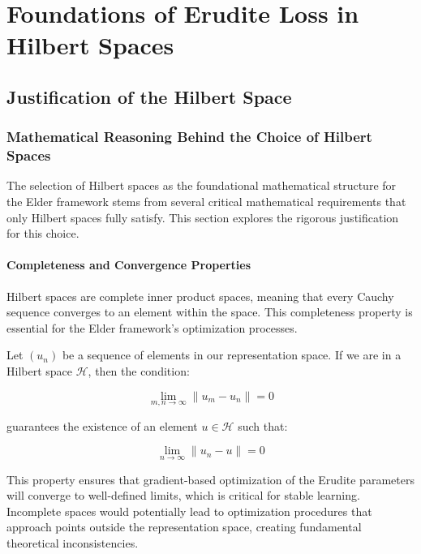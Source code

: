 \chapter{Foundations of Erudite Loss in Hilbert Spaces}

\section{Justification of the Hilbert Space}

\subsection{Mathematical Reasoning Behind the Choice of Hilbert Spaces}

The selection of Hilbert spaces as the foundational mathematical structure for the Elder framework stems from several critical mathematical requirements that only Hilbert spaces fully satisfy. This section explores the rigorous justification for this choice.

\subsubsection{Completeness and Convergence Properties}

Hilbert spaces are complete inner product spaces, meaning that every Cauchy sequence converges to an element within the space. This completeness property is essential for the Elder framework's optimization processes.

Let $(u_n)$ be a sequence of elements in our representation space. If we are in a Hilbert space $\mathcal{H}$, then the condition:

\begin{equation}
\lim_{m,n \to \infty} \|u_m - u_n\| = 0
\end{equation}

guarantees the existence of an element $u \in \mathcal{H}$ such that:

\begin{equation}
\lim_{n \to \infty} \|u_n - u\| = 0
\end{equation}

This property ensures that gradient-based optimization of the Erudite parameters will converge to well-defined limits, which is critical for stable learning. Incomplete spaces would potentially lead to optimization procedures that approach points outside the representation space, creating fundamental theoretical inconsistencies.

